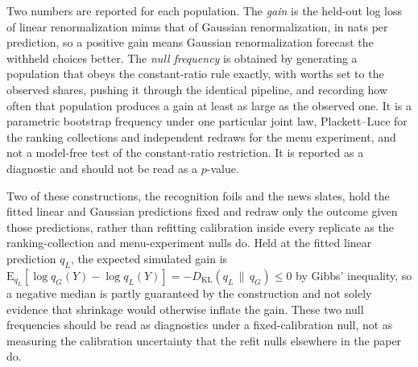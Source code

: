 \documentclass[11pt]{article}
\begin{document}
Two numbers are reported for each population. The \emph{gain} is the held-out log loss of linear
renormalization minus that of Gaussian renormalization, in nats per prediction, so a positive gain
means Gaussian renormalization forecast the withheld choices better. The \emph{null frequency} is
obtained by generating a population that obeys the constant-ratio rule exactly, with worths set to
the observed shares, pushing it through the identical pipeline, and recording how often that
population produces a gain at least as large as the observed one. It is a parametric bootstrap
frequency under one particular joint law, Plackett--Luce for the ranking collections and
independent redraws for the menu experiment, and not a model-free test of the constant-ratio
restriction. It is reported as a diagnostic and should not be read as a $p$-value.

Two of these constructions, the recognition foils and the news slates, hold the fitted linear and
Gaussian predictions fixed and redraw only the outcome given those predictions, rather than
refitting calibration inside every replicate as the ranking-collection and menu-experiment nulls
do. Held at the fitted linear prediction $q_L$, the expected simulated gain is
$\mathrm{E}_{q_L}[\log q_G(Y) - \log q_L(Y)] = -D_{\mathrm{KL}}(q_L \,\|\, q_G) \le 0$
by Gibbs' inequality, so a negative median is partly guaranteed by the construction and not solely
evidence that shrinkage would otherwise inflate the gain. These two null frequencies should be
read as diagnostics under a fixed-calibration null, not as measuring the calibration uncertainty
that the refit nulls elsewhere in the paper do.
\end{document}

